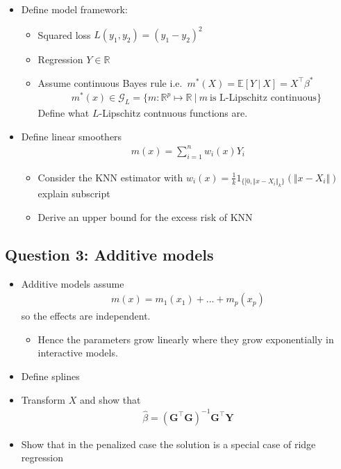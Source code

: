 \documentclass[
]{book}
\providecommand{\tightlist}{%
  \setlength{\itemsep}{0pt}\setlength{\parskip}{0pt}}
\begin{document}
\begin{itemize}
\tightlist
\item
  Define model framework:

  \begin{itemize}
  \tightlist
  \item
    Squared loss \(L(y_1,y_2)=(y_1-y_2)^2\)
  \item
    Regression \(Y\in \mathbb R\)
  \item
    Assume continuous Bayes rule i.e.~\(m^*(X)=\mathbb E[Y\ \vert\ X]=X^\top \beta^*\)
    \begin{align*}
    m^\ast(x)\in \mathcal G_L = \{m: \mathbb R^p \mapsto \mathbb R\ |\ m \ \text{is L-Lipschitz continuous}\}
    \end{align*}
    Define what \(L\)-Lipschitz contnuous functions are.
  \end{itemize}
\item
  Define linear smoothers
  \begin{align*}
    m(x)=\sum_{i=1}^nw_i(x) Y_i
    \end{align*}

  \begin{itemize}
  \tightlist
  \item
    Consider the KNN estimator with \(w_i(x)=\frac{1}{k}1_{\{[0,\Vert x-X_i\Vert_k\}}(\Vert x-X_i\Vert)\) explain subscript
  \item
    Derive an upper bound for the excess risk of KNN
  \end{itemize}
\end{itemize}

\hypertarget{question-3-additive-models}{%
\subsection{Question 3: Additive models}\label{question-3-additive-models}}

\begin{itemize}
\tightlist
\item
  Additive models assume
  \begin{align*}
    m(x)=m_1(x_1)+...+m_p(x_p)
    \end{align*}
  so the effects are independent.

  \begin{itemize}
  \tightlist
  \item
    Hence the parameters grow linearly where they grow exponentially in interactive models.
  \end{itemize}
\item
  Define splines
\item
  Transform \(X\) and show that
  \begin{align*}
    \hat\beta = (\mathbf G^\top \mathbf G)^{-1}\mathbf G^\top \mathbf Y
    \end{align*}
\item
  Show that in the penalized case the solution is a special case of ridge regression
\end{itemize}
\end{document}
